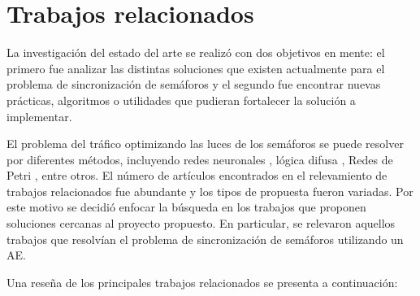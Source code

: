 \section{Trabajos relacionados}

La investigación del estado del arte se realizó con dos objetivos en mente: el primero fue analizar las distintas soluciones que existen actualmente para el problema de sincronización de semáforos y el segundo fue encontrar nuevas prácticas, algoritmos o utilidades que pudieran fortalecer la solución a implementar.

El problema del tráfico optimizando las luces de los semáforos se puede resolver por diferentes métodos, incluyendo redes neuronales \citep{Lopez1999}, lógica difusa \citep{Lim2001}, Redes de Petri \citep{DiFebbraro2002}, entre otros. El número de artículos encontrados en el relevamiento de trabajos relacionados fue abundante y los tipos de propuesta fueron variadas. Por este motivo se decidió enfocar la búsqueda en los trabajos que proponen soluciones cercanas al proyecto propuesto. En particular, se relevaron aquellos trabajos que resolvían el problema de sincronización de semáforos utilizando un AE.

Una reseña de los principales trabajos relacionados se presenta a continuación:


